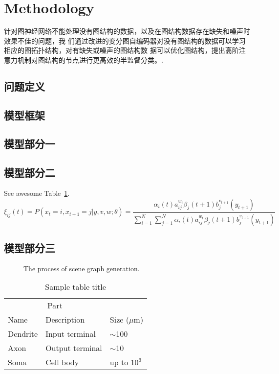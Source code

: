\documentclass{article}
\begin{document}
\section{Methodology}
\textbf{\label{section:3}}
针对图神经网络不能处理没有图结构的数据，以及在图结构数据存在缺失和噪声时效果不佳的问题，我
们通过改进的变分图自编码器对没有图结构的数据可以学习相应的图拓扑结构，对有缺失或噪声的图结构数
据可以优化图结构，提出高阶注意力机制对图结构的节点进行更高效的半监督分类。\cite{kour2014real,kour2014fast}\cite{hadash2018estimate}.
\subsection{问题定义}
\subsection{模型框架}
\subsection{模型部分一}
\subsection{模型部分二}
See awesome Table~\ref{tab:table}.
\begin{equation}\label{eq:1}
\xi _{ij}(t)=P(x_{t}=i,x_{t+1}=j|y,v,w;\theta)= {\frac {\alpha _{i}(t)a^{w_t}_{ij}\beta _{j}(t+1)b^{v_{t+1}}_{j}(y_{t+1})}{\sum _{i=1}^{N} \sum _{j=1}^{N} \alpha _{i}(t)a^{w_t}_{ij}\beta _{j}(t+1)b^{v_{t+1}}_{j}(y_{t+1})}}
\end{equation}

\subsection{模型部分三}
\begin{figure}[h]
	\centering
        \fbox{\rule[-.5cm]{4cm}{4cm} \rule[-.5cm]{4cm}{0cm}}
	\caption{The process of scene graph generation.}
	\label{fig:1}       %
\end{figure}

\begin{table}
 \caption{Sample table title}
  \centering
  \begin{tabular}{lll}
    \toprule
    \multicolumn{2}{c}{Part}                   \\
    \cmidrule(r){1-2}
    Name     & Description     & Size ($\mu$m) \\
    \midrule
    Dendrite & Input terminal  & $\sim$100     \\
    Axon     & Output terminal & $\sim$10      \\
    Soma     & Cell body       & up to $10^6$  \\
    \bottomrule
  \end{tabular}
  \label{tab:table}
\end{table}
\end{document}
